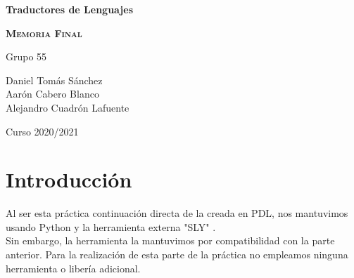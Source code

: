 \documentclass[11pt, , a4paper, titlepage]{article}
\begin{document}
\begin{titlepage}
    \begin{center}
        \hrulefill

        \vspace{0.5cm}
        {\bfseries\Huge Traductores de Lenguajes \par}
        \vspace{3cm}

        {\scshape \LARGE \textbf{Memoria Final}}

        \hrulefill

        \vspace{2.0cm}
    \end{center}

    \centering


    \Large{Grupo 55}\\
    \vspace{0.3cm}

    {\large Daniel Tomás Sánchez\\ Aarón Cabero Blanco\\ Alejandro Cuadrón Lafuente\par}

    \vspace{2cm}
    {\Large Curso 2020/2021 \par}
\end{titlepage}


\tableofcontents
\clearpage


\section{Introducción}
Al ser esta práctica continuación directa de la creada en PDL, nos mantuvimos usando Python y la herramienta externa "SLY" \cite{SLY}. \\
Sin embargo, la herramienta la mantuvimos por compatibilidad con la parte anterior. Para la realización de esta parte de la práctica no empleamos ninguna herramienta o libería adicional.\\
\end{document}
